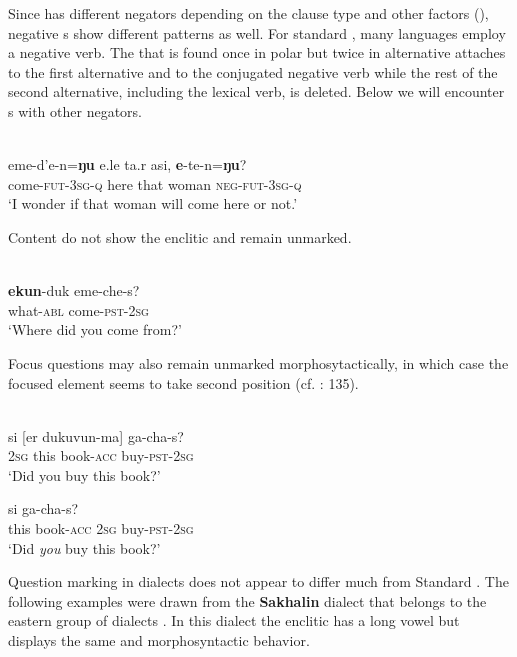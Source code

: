 Since  has different negators depending on the clause type and other factors (\citealt{Hölzl2015a}), negative s show different patterns as well. For standard , many  languages employ a negative verb. The  that is found once in polar but twice in alternative  attaches to the first alternative and to the conjugated negative verb while the rest of the second alternative, including the lexical verb, is deleted. Below we will encounter s with other negators.

\ea%
    \label{ex:tungu:5}
    \\
    \gll eme-d{’e-n}{=}\textbf{{ŋu}} e{.le} ta{.r} asi, \textbf{{e}}{-te-n}{=}\textbf{{ŋu}}?\\
    come-\textsc{fut}-3\textsc{sg}-\textsc{q}  here  that  woman    \textsc{neg}-\textsc{fut}-3\textsc{sg}-\textsc{q}\\
    \glt ‘I wonder if that woman will come here or not.’ \citep[7]{Nedjalkov1997}
    \z

Content  do not show the enclitic and remain unmarked.

\ea%
    \label{ex:tungu:6}
    \\
    \gll \textbf{{e}}\textbf{{kun}}{-duk} eme-che-s?\\
    what-\textsc{abl}  come-\textsc{pst}-2\textsc{sg}\\
    \glt ‘Where did you come from?’ \citep[3]{Nedjalkov1997}
    \z

Focus questions may also remain unmarked morphosytactically, in which case the focused element seems to take second position (cf. \citealt{Nedjalkov1997}: 135).

\newpage 
\ea%
    \label{ex:tungu:7}
    \\
    \ea
    \gll si [er   dukuvun-ma]  ga-cha-s?\\
    2\textsc{sg}  this  book-\textsc{acc} buy-\textsc{pst}-2\textsc{sg}\\
    \glt ‘Did you buy this book?’
    
    \ex
    \gll [er   dukuvun-ma] si ga-cha-s?\\
    this  book-\textsc{acc}  2\textsc{sg}  buy-\textsc{pst}-2\textsc{sg}\\
    \glt ‘Did \textit{you} buy this book?’ \citep[5]{Nedjalkov1997}
    \z
    \z

Question marking in  dialects does not appear to differ much from Standard . The following examples were drawn from the \textbf{Sakhalin} dialect that belongs to the eastern group of dialects \citep{Atknine1997}. In this dialect the enclitic has a long vowel but displays the same  and morphosyntactic behavior.

